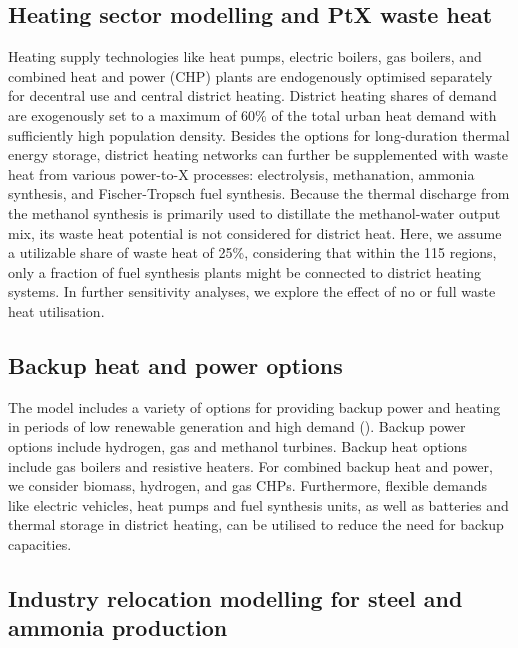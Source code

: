 \subsection*{Heating sector modelling and PtX waste heat}
\label{sec:methods-heating}

Heating supply technologies like heat pumps, electric boilers, gas boilers, and
combined heat and power (CHP) plants are endogenously optimised separately for
decentral use and central district heating. District heating shares of demand
are exogenously set to a maximum of 60\% of the total urban heat demand with
sufficiently high population density. Besides the options for long-duration
thermal energy storage, district heating networks can further be supplemented
with waste heat from various power-to-X processes: electrolysis, methanation,
ammonia synthesis, and Fischer-Tropsch fuel synthesis. Because the thermal
discharge from the methanol synthesis is primarily used to distillate the
methanol-water output mix,\cite{brownUltralongdurationEnergyStorage2023} its
waste heat potential is not considered for district heat. Here, we assume a
utilizable share of waste heat of 25\%, considering that within the 115 regions,
only a fraction of fuel synthesis plants might be connected to district heating
systems. In further sensitivity analyses, we explore the effect of no or full
waste heat utilisation.

\subsection*{Backup heat and power options}
\label{sec:methods-backup}

The model includes a variety of options for providing backup power and heating
in periods of low renewable generation and high demand
(). Backup power options include
hydrogen, gas and methanol turbines. Backup heat options include gas boilers and
resistive heaters. For combined backup heat and power, we consider biomass,
hydrogen, and gas CHPs. Furthermore, flexible demands like electric vehicles,
heat pumps and fuel synthesis units, as well as batteries and thermal storage in
district heating, can be utilised to reduce the need for backup capacities. 

\subsection*{Industry relocation modelling for steel and ammonia production}
\label{sec:methods-industry}

